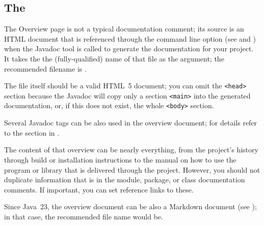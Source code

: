\subsection{The }\label{sec:OverviewDoc}
The Overview page is not a typical documentation comment; its source is an HTML document that is referenced through the command line option \mbox{} (see  and \autocite{ORACLE_DOC_JAVADOC_MAN:StandardDocletOptions}) when the Javadoc tool is called to generate the documentation for your project. It takes the the (fully-qualified) name of that file as the argument; the recommended filename is .

The file itself should be a valid HTML~5 document; you can omit the \lstinline|<head>| section because the Javadoc will copy only a section \lstinline|<main>| into the generated documentation, or, if this does not exist, the whole \lstinline|<body>| section.

Several Javadoc tags can be also used in the overview document; for details refer to the section in \autocite{ORACLE_DOC_JAVADOC_TAG}.

The content of that overview can be nearly everything, from the project's history through build or installation instructions to the manual on how to use the program or library that is delivered through the project. However, you should not duplicate information that is in the module, package, or class documentation comments. If important, you can set reference links to these.

Since Java~23, the overview document can be also a Markdown document (see \autocite{JEP467,ORACLE_DOC_JAVADOC_GUIDE:Markdown}); in that case, the recommended file name would be\linebreak {}. 


